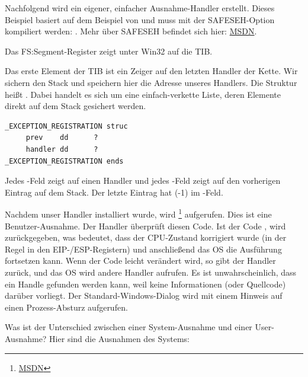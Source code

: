 Nachfolgend wird ein eigener, einfacher Ausnahme-Handler erstellt.
Dieses Beispiel basiert auf dem Beispiel von \PietrekSEH und muss mit der SAFESEH-Option
kompiliert werden: .
Mehr über SAFESEH befindet sich hier: \href{http://msdn.microsoft.com/en-us/library/9a89h429.aspx}{MSDN}.



Das FS:Segment-Register zeigt unter Win32 auf die \ac{TIB}.

Das erste Element der \ac{TIB} ist ein Zeiger auf den letzten Handler der Kette.
Wir sichern den Stack und speichern hier die Adresse unseres Handlers.
Die Struktur heißt . Dabei handelt es sich um eine
einfach-verkette Liste, deren Elemente direkt auf dem Stack gesichert werden.

\begin{lstlisting}[caption=MSVC/VC/crt/src/exsup.inc,style=customasmx86]
_EXCEPTION_REGISTRATION struc
     prev    dd      ?
     handler dd      ?
_EXCEPTION_REGISTRATION ends
\end{lstlisting}

Jedes -Feld zeigt auf einen Handler und jedes -Feld zeigt auf den
vorherigen Eintrag auf dem Stack.
Der letzte Eintrag hat  (-1) im -Feld.



Nachdem unser Handler installiert wurde, wird 
\footnote{\href{http://msdn.microsoft.com/en-us/library/windows/desktop/ms680552(v=vs.85).aspx}{MSDN}} aufgerufen.
Dies ist eine Benutzer-Ausnahme.
Der Handler überprüft diesen Code.
Ist der Code , wird  zurückgegeben,
was bedeutet, dass der CPU-Zustand korrigiert wurde (in der Regel in den EIP-/ESP-Registern)
und anschließend das \ac{OS} die Ausführung fortsetzen kann.
Wenn der Code leicht verändert wird, so gibt der Handler  zurück,
und das \ac{OS} wird andere Handler aufrufen.
Es ist unwahrscheinlich, dass ein Handle gefunden werden kann, weil keine Informationen
(oder Quellcode) darüber vorliegt.
Der Standard-Windows-Dialog wird mit einem Hinweis auf einen Prozess-Absturz aufgerufen.

Was ist der Unterschied zwischen einer System-Ausnahme und einer User-Ausnahme?
Hier sind die Ausnahmen des Systems:

